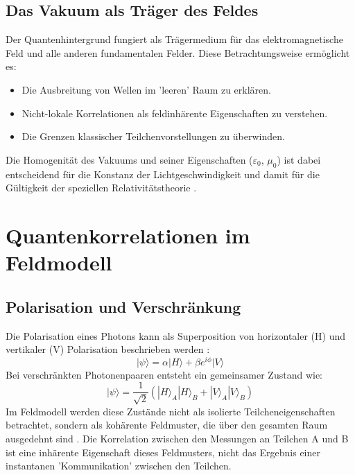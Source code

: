 \documentclass[12pt,a4paper]{article}
\begin{document}
	\subsection{Das Vakuum als Träger des Feldes}
	Der Quantenhintergrund fungiert als Trägermedium für das elektromagnetische Feld und alle anderen fundamentalen Felder. Diese Betrachtungsweise ermöglicht es:
	\begin{itemize}
		\item Die Ausbreitung von Wellen im 'leeren' Raum zu erklären.
		\item Nicht-lokale Korrelationen als feldinhärente Eigenschaften zu verstehen.
		\item Die Grenzen klassischer Teilchenvorstellungen zu überwinden.
	\end{itemize}
	Die Homogenität des Vakuums und seiner Eigenschaften (\(\varepsilon_0\), \(\mu_0\)) ist dabei entscheidend für die Konstanz der Lichtgeschwindigkeit und damit für die Gültigkeit der speziellen Relativitätstheorie \cite{Weinberg1995}.
	
	\section{Quantenkorrelationen im Feldmodell}
	\subsection{Polarisation und Verschränkung}
	Die Polarisation eines Photons kann als Superposition von horizontaler (H) und vertikaler (V) Polarisation beschrieben werden \cite{Fox2006}:
	\begin{equation}
		|\psi\rangle = \alpha |H\rangle + \beta e^{i\phi} |V\rangle
	\end{equation}
	Bei verschränkten Photonenpaaren entsteht ein gemeinsamer Zustand wie:
	\begin{equation}
		|\psi\rangle = \frac{1}{\sqrt{2}} (|H\rangle_A |H\rangle_B + |V\rangle_A |V\rangle_B)
	\end{equation}
	Im Feldmodell werden diese Zustände nicht als isolierte Teilcheneigenschaften betrachtet, sondern als kohärente Feldmuster, die über den gesamten Raum ausgedehnt sind \cite{Zeilinger2010}. Die Korrelation zwischen den Messungen an Teilchen A und B ist eine inhärente Eigenschaft dieses Feldmusters, nicht das Ergebnis einer instantanen 'Kommunikation' zwischen den Teilchen.
	
\end{document}
